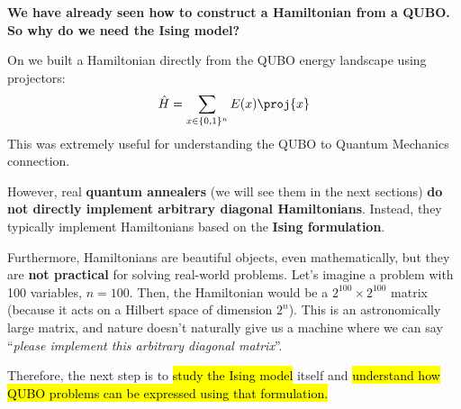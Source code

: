 \highspace
\begin{flushleft}
    \textcolor{Red2}{ \textbf{We have already seen how to construct a Hamiltonian from a QUBO. So why do we need the Ising model?}}
\end{flushleft}
On  we built a Hamiltonian directly from the QUBO energy landscape using projectors:
\begin{equation*}
    \hat{H} = \sum_{x \in \{0,1\}^{n}} E(x) \proj{x}
\end{equation*}
\textcolor{Green3}{} This was extremely useful for understanding the QUBO to Quantum Mechanics connection.

\highspace
\textcolor{Red2}{} However, real \textbf{quantum annealers} (we will see them in the next sections) \textbf{do not directly implement arbitrary diagonal Hamiltonians}. Instead, they typically implement Hamiltonians based on the \textbf{Ising formulation}.

\highspace
\textcolor{Red2}{} Furthermore, Hamiltonians are beautiful objects, even mathematically, but they are \textbf{not practical} for solving real-world problems. Let's imagine a problem with 100 variables, $n = 100$. Then, the Hamiltonian would be a $2^{100} \times 2^{100}$ matrix (because it acts on a Hilbert space of dimension $2^n$). This is an astronomically large matrix, and nature doesn't naturally give us a machine where we can say ``\emph{please implement this arbitrary diagonal matrix}''.

\highspace
Therefore, the next step is to \hl{study the Ising model} itself and \hl{understand how QUBO problems can be expressed using that formulation.}